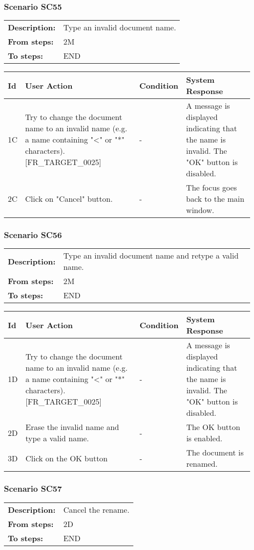 \documentclass[a4paper,11pt]{article}
\newcommand{\bl}{\\ \hline}
\begin{document}
\subsubsection*{Scenario SC55}
\begin{tabular}{p{1in}p{4in}}
{\bf Description:} & Type an invalid document name. \\
{\bf From steps:} & 2M \\
{\bf To steps:} & END \\
\end{tabular}
 
\begin{tabular}{|p{0.8in}|p{1.6in}|p{1.6in}|p{1.6in}|}
\hline
Id & User Action & Condition & System Response  \bl 
1C & Try to change the document name to an invalid name (e.g. a
						name containing "<" or "*" characters). [FR_TARGET_0025]
					 & - & A message is displayed indicating that the name is
						invalid. The "OK" button is disabled. \bl 
2C & Click on "Cancel" button. & - & The focus goes back to the main window. \bl 
\end{tabular}
\subsubsection*{Scenario SC56}
\begin{tabular}{p{1in}p{4in}}
{\bf Description:} & Type an invalid document name and retype a valid name.
				 \\
{\bf From steps:} & 2M \\
{\bf To steps:} & END \\
\end{tabular}
 
\begin{tabular}{|p{0.8in}|p{1.6in}|p{1.6in}|p{1.6in}|}
\hline
Id & User Action & Condition & System Response  \bl 
1D & Try to change the document name to an invalid name (e.g. a
						name containing "<" or "*" characters). [FR_TARGET_0025]
					 & - & A message is displayed indicating that the name is
						invalid. The "OK" button is disabled. \bl 
2D & Erase the invalid name and type a valid name. & - & The OK button is enabled. \bl 
3D & Click on the OK button & - & The document is renamed. \bl 
\end{tabular}
\subsubsection*{Scenario SC57}
\begin{tabular}{p{1in}p{4in}}
{\bf Description:} & Cancel the rename. \\
{\bf From steps:} & 2D \\
{\bf To steps:} & END \\
\end{tabular}
 
\end{document}
